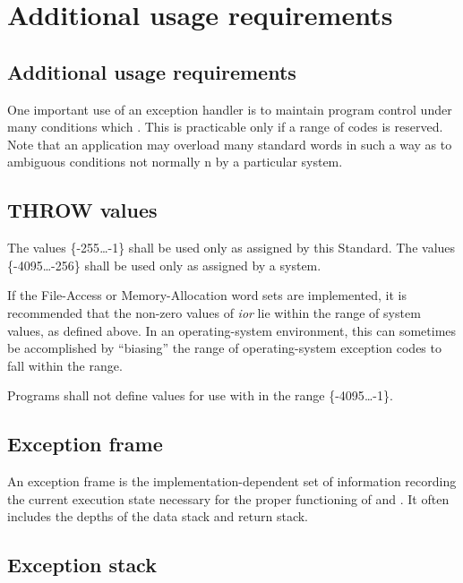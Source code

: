 \section{Additional usage requirements} %

\begin{info}
\subsection{Additional usage requirements}

One important use of an exception handler is to maintain program
control under many conditions which . This is practicable
only if a range of codes is reserved. Note that an application may
overload many standard words in such a way as to 
ambiguous conditions not normally n by a particular
system.
\end{info}

\subsection{THROW values} %
\label{exception:throw}

The  values \{-255{\ldots}-1\} shall be used only as
assigned by this Standard. The values \{-4095{\ldots}-256\}
shall be used only as assigned by a system.

If the File-Access or Memory-Allocation word sets are implemented,
it is recommended that the non-zero values of \emph{ior} lie within
the range of system  values, as defined above. In an
operating-system environment, this can sometimes be accomplished
by ``biasing'' the range of operating-system exception codes to fall
within the  range.

Programs shall not define values for use with  in the
range \{-4095{\ldots}-1\}.

\subsection{Exception frame} %

An exception frame is the implementation-dependent set of
information recording the current execution state necessary for
the proper functioning of  and . It often
includes the depths of the data stack and return stack.

\subsection{Exception stack} %

